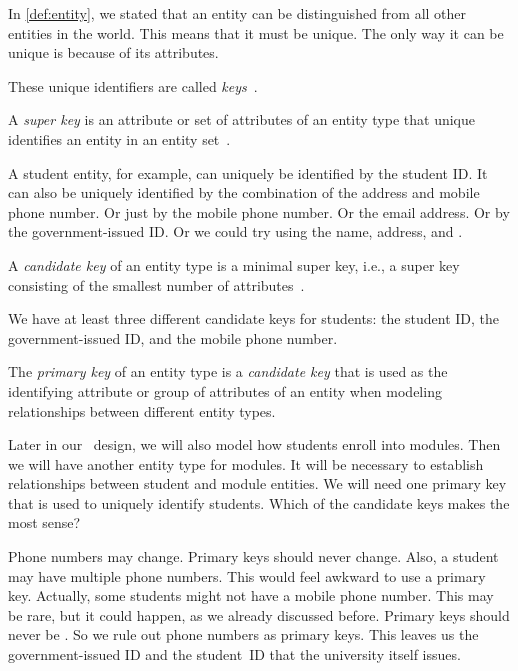 %
%
%
In \cref{def:entity}, we stated that an entity can be distinguished from all other entities in the world.
This means that it must be unique.
The only way it can be unique is because of its attributes.

These unique identifiers are called \emph{keys}~\cite{S2024D:CDMERDE}.%
%
\begin{definition}%
A \emph{super key} is an attribute or set of attributes of an entity type that unique identifies an entity in an entity set~\cite{S2024D:CDMERDE,G2011EW2ITDS:CMUTERM}.%
\end{definition}%
%
A student entity, for example, can uniquely be identified by the student ID.
It can also be uniquely identified by the combination of the address and mobile phone number.
Or just by the mobile phone number.
Or the email address.
Or by the government-issued ID.
Or we could try using the name, address, and .%
%
\begin{definition}%
A \emph{candidate key} of an entity type is a minimal super key, i.e., a super key consisting of the smallest number of attributes~\cite{S2024D:CDMERDE,G2011EW2ITDS:CMUTERM}.%
\end{definition}%
%
We have at least three different candidate keys for students:
the student ID, the government-issued ID, and the mobile phone number.%
%
\begin{definition}%
\label{sec:primaryKey}%
The \emph{primary key} of an entity type is a \emph{candidate key} that is used as the identifying attribute or group of attributes of an entity when modeling relationships between different entity types.%
\end{definition}%
%
Later in our \db\ design, we will also model how students enroll into modules.
Then we will have another entity type for modules.
It will be necessary to establish relationships between student and module entities.
We will need one primary key that is used to uniquely identify students.
Which of the candidate keys makes the most sense?

Phone numbers may change.
Primary keys should never change.
Also, a student may have multiple phone numbers.
This would feel awkward to use a primary key.
Actually, some students might not have a mobile phone number.
This may be rare, but it could happen, as we already discussed before.
Primary keys should never be .
So we rule out phone numbers as primary keys.
This leaves us the government-issued ID and the student~ID that the university itself issues.

